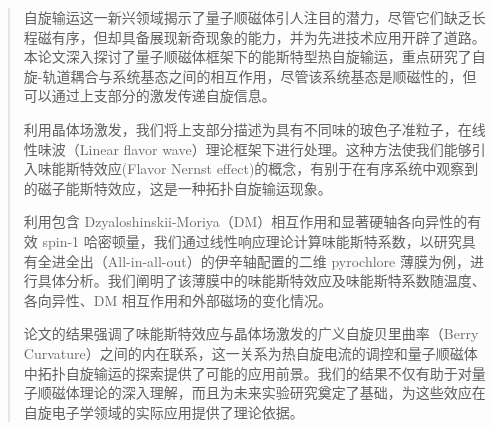 \documentclass[type=master]{fduthesis}
\begin{document}

\frontmatter

\tableofcontents
\listoffigures

\begin{abstract}
  自旋输运这一新兴领域揭示了量子顺磁体引人注目的潜力，尽管它们缺乏长程磁有序，但却具备展现新奇现象的能力，并为先进技术应用开辟了道路。本论文深入探讨了量子顺磁体框架下的能斯特型热自旋输运，重点研究了自旋-轨道耦合与系统基态之间的相互作用，尽管该系统基态是顺磁性的，但可以通过上支部分的激发传递自旋信息。

  利用晶体场激发，我们将上支部分描述为具有不同味的玻色子准粒子，在线性味波（Linear flavor wave）理论框架下进行处理。这种方法使我们能够引入味能斯特效应(Flavor Nernst effect)的概念，有别于在有序系统中观察到的磁子能斯特效应，这是一种拓扑自旋输运现象。

  利用包含 Dzyaloshinskii-Moriya（DM）相互作用和显著硬轴各向异性的有效 spin-1 哈密顿量，我们通过线性响应理论计算味能斯特系数，以研究具有全进全出（All-in-all-out）的伊辛轴配置的二维 pyrochlore 薄膜为例，进行具体分析。我们阐明了该薄膜中的味能斯特效应及味能斯特系数随温度、各向异性、DM 相互作用和外部磁场的变化情况。

  论文的结果强调了味能斯特效应与晶体场激发的广义自旋贝里曲率（Berry Curvature）之间的内在联系，这一关系为热自旋电流的调控和量子顺磁体中拓扑自旋输运的探索提供了可能的应用前景。我们的结果不仅有助于对量子顺磁体理论的深入理解，而且为未来实验研究奠定了基础，为这些效应在自旋电子学领域的实际应用提供了理论依据。
\end{abstract}
\end{document}

